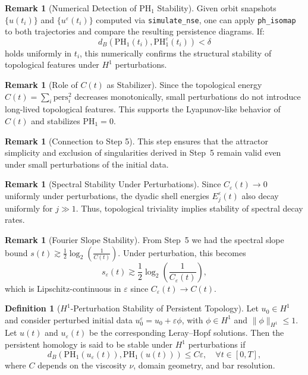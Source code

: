 \documentclass[11pt]{article}
\theoremstyle{definition}
\newtheorem{definition}[theorem]{Definition}
\newtheorem{remark}[theorem]{Remark}
\begin{document}
\begin{remark}[Numerical Detection of PH$_1$ Stability]
Given orbit snapshots $\{ u(t_i) \}$ and $\{ u^\varepsilon(t_i) \}$ computed via \texttt{simulate\_nse}, one can apply \texttt{ph\_isomap} to both trajectories and compare the resulting persistence diagrams. If:
\[
d_B(\mathrm{PH}_1(t_i), \mathrm{PH}_1^\varepsilon(t_i)) < \delta
\]
holds uniformly in $t_i$, this numerically confirms the structural stability of topological features under $H^1$ perturbations.
\end{remark}

\begin{remark}[Role of $C(t)$ as Stabilizer]
Since the topological energy $C(t) = \sum_i \mathrm{pers}_i^2$ decreases monotonically, small perturbations do not introduce long-lived topological features. This supports the Lyapunov-like behavior of $C(t)$ and stabilizes $\mathrm{PH}_1 = 0$.
\end{remark}

\begin{remark}[Connection to Step 5]
This step ensures that the attractor simplicity and exclusion of singularities derived in Step~5 remain valid even under small perturbations of the initial data.
\end{remark}

\begin{remark}[Spectral Stability Under Perturbations]
Since $C_\varepsilon(t) \to 0$ uniformly under perturbations, the dyadic shell energies $E_j^\varepsilon(t)$ also decay uniformly for $j \gg 1$. Thus, topological triviality implies stability of spectral decay rates.
\end{remark}

\begin{remark}[Fourier Slope Stability]
From Step~5 we had the spectral slope bound $s(t) \gtrsim \frac{1}{2} \log_2 \left(\frac{1}{C(t)}\right)$. Under perturbation, this becomes
\[
s_\varepsilon(t) \gtrsim \frac{1}{2} \log_2 \left(\frac{1}{C_\varepsilon(t)}\right),
\]
which is Lipschitz-continuous in $\varepsilon$ since $C_\varepsilon(t) \to C(t)$.
\end{remark}

\begin{definition}[$H^1$-Perturbation Stability of Persistent Topology]
Let $u_0 \in H^1$ and consider perturbed initial data $u_0^\varepsilon = u_0 + \varepsilon \phi$, with $\phi \in H^1$ and $\|\phi\|_{H^1} \le 1$. Let $u(t)$ and $u_\varepsilon(t)$ be the corresponding Leray--Hopf solutions. Then the persistent homology is said to be stable under $H^1$ perturbations if
\[
d_B(\mathrm{PH}_1(u_\varepsilon(t)), \mathrm{PH}_1(u(t))) \le C \varepsilon, \quad \forall t \in [0, T],
\]
where $C$ depends on the viscosity $\nu$, domain geometry, and bar resolution.
\end{definition}
\end{document}
